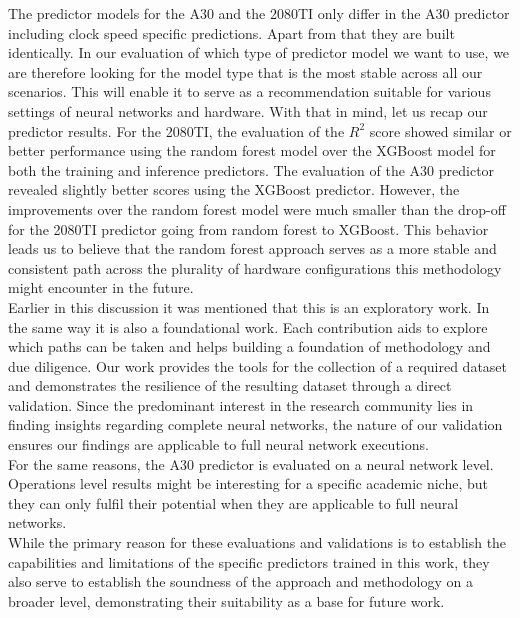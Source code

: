 The predictor models for the A30 and the 2080TI only differ in the A30 predictor including clock speed specific predictions. Apart from that they are built identically. In our evaluation of which type of predictor model we want to use, we are therefore looking for the model type that is the most stable across all our scenarios. This will enable it to serve as a recommendation suitable for various settings of neural networks and hardware. With that in mind, let us recap our predictor results. For the 2080TI, the evaluation of the $R^2$ score showed similar or better performance using the random forest model over the XGBoost model for both the training and inference predictors. The evaluation of the A30 predictor revealed slightly better scores using the XGBoost predictor. However, the improvements over the random forest model were much smaller than the drop-off for the 2080TI predictor going from random forest to XGBoost. This behavior leads us to believe that the random forest approach serves as a more stable and consistent path across the plurality of hardware configurations this methodology might encounter in the future. \\
Earlier in this discussion it was mentioned that this is an exploratory work. In the same way it is also a foundational work. Each contribution aids to explore which paths can be taken and helps building a foundation of methodology and due diligence. Our work provides the tools for the collection of a required dataset and demonstrates the resilience of the resulting dataset through a direct validation. Since the predominant interest in the research community lies in finding insights regarding complete neural networks, the nature of our validation ensures our findings are applicable to full neural network executions. \\ 
For the same reasons, the A30 predictor is evaluated on a neural network level. Operations level results might be interesting for a specific academic niche, but they can only fulfil their potential when they are applicable to full neural networks. \\
While the primary reason for these evaluations and validations is to establish the capabilities and limitations of the specific predictors trained in this work, they also serve to establish the soundness of the approach and methodology on a broader level, demonstrating their suitability as a base for future work.


